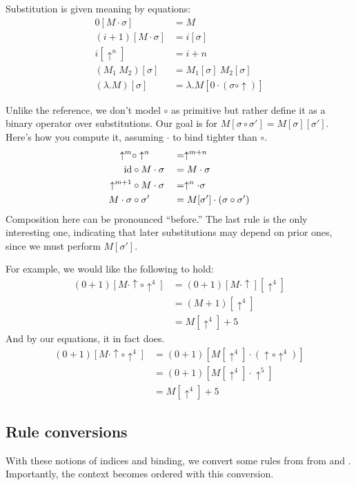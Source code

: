 Substitution is given meaning by equations:
\begin{align*}
  0[M \cdot \sigma] &= M\\
  (i+1)[M \cdot \sigma] &= i[\sigma]\\
  i[\uparrow^n] &= i+n\\
  (M_1~M_2)[\sigma] &= M_1[\sigma]~M_2[\sigma]\\
  (\lambda.M)[\sigma] &= \lambda.M[0 \cdot (\sigma \circ \uparrow)]
\end{align*}

Unlike the reference, we don't model $\circ$ as primitive but rather define it as a binary operator
over substitutions. Our goal is for $M[\sigma \circ \sigma'] = M[\sigma][\sigma']$.
Here's how you compute it, assuming $\cdot$ to bind tighter than $\circ$.
\begin{align*}
  \uparrow^m &\circ \uparrow^n &&= \uparrow^{m+n}\\
  \operatorname{id} &\circ M \cdot \sigma &&= M \cdot \sigma\\
  \uparrow^{m+1} &\circ M \cdot \sigma &&= \uparrow^n \cdot \sigma\\
  M \cdot \sigma &\circ \sigma' &&= M[\sigma'] \cdot (\sigma \circ \sigma')
\end{align*}
Composition here can be pronounced ``before.'' The last rule is the only interesting one, indicating
that later substitutions may depend on prior ones, since we must perform $M[\sigma']$.

For example, we would like the following to hold:
\begin{align*}
  (0+1) [M \cdot \uparrow \circ \uparrow^4] &= (0+1) [M \cdot \uparrow][\uparrow^4]\\
  &= (M + 1)[\uparrow^4]\\
  &= M[\uparrow^4] + 5
\end{align*}
And by our equations, it in fact does.
\begin{align*}
  (0 + 1) [M \cdot \uparrow \circ \uparrow^4] &= (0 + 1) [M[\uparrow^4] \cdot (\uparrow \circ \uparrow^4)]\\
  &= (0 + 1) [M[\uparrow^4] \cdot \uparrow^5]\\
  &= M[\uparrow^4] + 5
\end{align*}

\subsection{Rule conversions}
With these notions of indices and binding, we convert some rules from
from  and . Importantly, the context becomes ordered with this conversion.

